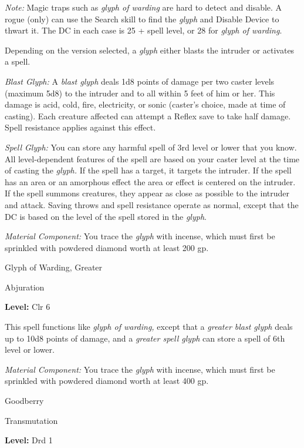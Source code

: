 \documentclass{article}
\begin{document}
\textit{Note: }Magic traps such as \textit{glyph of warding }are hard to detect 
and disable. A rogue (only) can use the Search skill to find the \textit{glyph 
}and Disable Device to thwart it. The DC in each case is 25 + spell level, or 28 
for \textit{glyph of warding}.

Depending on the version selected, a \textit{glyph }either blasts the intruder 
or activates a spell.

\textit{Blast Glyph: }A \textit{blast glyph }deals 1d8 points of damage per two 
caster levels (maximum 5d8) to the intruder and to all within 5 feet of him or 
her. This damage is acid, cold, fire, electricity, or sonic (caster's choice, made 
at time of casting). Each creature affected can attempt a Reflex save to take half 
damage. Spell resistance applies against this effect.

\textit{Spell Glyph: }You can store any harmful spell of 3rd level or lower that 
you know. All level-dependent features of the spell are based on your caster level 
at the time of casting the \textit{glyph. }If the spell has a target, it targets 
the intruder. If the spell has an area or an amorphous effect the area or effect 
is centered on the intruder. If the spell summons creatures, they appear as close 
as possible to the intruder and attack. Saving throws and spell resistance operate 
as normal, except that the DC is based on the level of the spell stored in the 
\textit{glyph}.

\textit{Material Component: }You trace the \textit{glyph }with incense, which must 
first be sprinkled with powdered diamond worth at least 200 gp.

\vspace{12pt}
Glyph of Warding, Greater

Abjuration

\textbf{Level:} Clr 6

This spell functions like \textit{glyph of warding, }except that a \textit{greater 
blast glyph }deals up to 10d8 points of damage, and a \textit{greater spell glyph 
}can store a spell of 6th level or lower.

\textit{Material Component: }You trace the \textit{glyph }with incense, which must 
first be sprinkled with powdered diamond worth at least 400 gp.

\vspace{12pt}
Goodberry

Transmutation

\textbf{Level:} Drd 1
\end{document}
